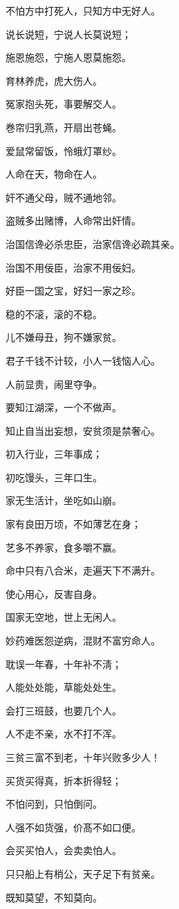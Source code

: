 \documentclass[12pt,oneside]{book}
\begin{document}
不怕方中打死人，只知方中无好人。

说长说短，宁说人长莫说短；

施恩施怨，宁施人恩莫施怨。

育林养虎，虎大伤人。

冤家抱头死，事要解交人。

巻帘归乳燕，开扇出苍蝇。

爱鼠常留饭，怜蛾灯罩纱。

人命在天，物命在人。

奸不通父母，贼不通地邻。

盗贼多出赌博，人命常出奸情。

治国信谗必杀忠臣，治家信谗必疏其亲。

治国不用佞臣，治家不用佞妇。

好臣一国之宝，好妇一家之珍。

稳的不滚，滚的不稳。

儿不嫌母丑，狗不嫌家贫。

君子千钱不计较，小人一钱恼人心。

人前显贵，闹里夺争。

要知江湖深，一个不做声。

知止自当出妄想，安贫须是禁奢心。

初入行业，三年事成；

初吃馒头，三年口生。

家无生活计，坐吃如山崩。

家有良田万顷，不如薄艺在身；

艺多不养家，食多嚼不赢。

命中只有八合米，走遍天下不满升。

使心用心，反害自身。

国家无空地，世上无闲人。

妙药难医怨逆病，混财不富穷命人。

耽误一年春，十年补不淸；

人能处处能，草能处处生。

会打三班鼓，也要几个人。

人不走不亲，水不打不浑。

三贫三富不到老，十年兴败多少人！

买货买得真，折本折得轻；

不怕问到，只怕倒问。

人强不如货强，价髙不如口便。

会买买怕人，会卖卖怕人。

只只船上有梢公，天子足下有贫亲。

既知莫望，不知莫向。
\end{document}
